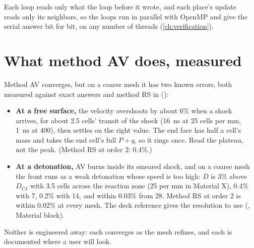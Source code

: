 Each loop reads only what the loop before it wrote, and each place's update
reads only its neighbors, so the loops run in parallel with OpenMP and give
the serial answer bit for bit, on any number of threads
(\cref{ch:verification}).

\section{What method AV does, measured}
\label{sec:av-measured}

Method AV converges, but on a coarse mesh it has two known errors, both
measured against exact answers and method RS in
 ():

\begin{itemize}
\item \textbf{At a free surface,} the velocity overshoots by about 6\% when
  a shock arrives, for about 2.5 cells' transit of the shock (16~ns at 25
  cells per mm, 1~ns at 400), then settles on the right value. The end face
  has half a cell's mass and takes the end cell's full $P + q$, so it rings
  once. Read the plateau, not the peak. (Method RS at order 2: 0.4\%.)
\item \textbf{At a detonation,} AV burns inside its smeared shock, and on a
  coarse mesh the front runs as a weak detonation whose speed is too high:
  $D$ is 3\%
  above $D_{\mathrm{CJ}}$ with 3.5 cells across the reaction zone (25 per mm
  in Material X), 0.4\% with 7, 0.2\% with 14, and within 0.03\% from 28.
  Method RS at order 2 is within 0.02\% at every mesh. The deck reference
  gives the resolution to use (, Material block).
\end{itemize}

Neither is engineered away: each converges as the mesh refines, and each is
documented where a user will look.
